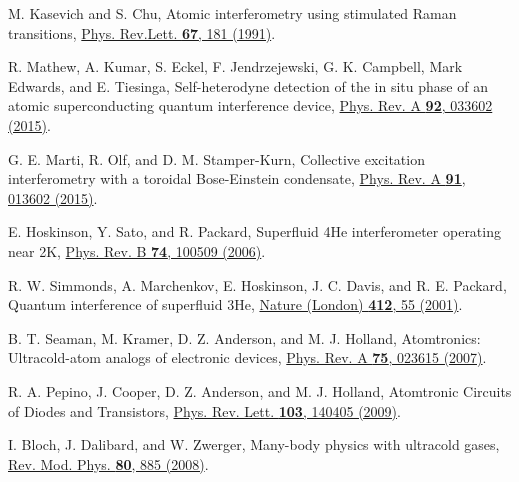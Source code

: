\documentclass[twocolumn,prl,floatfix,citeautoscript,nofootinbib]{revtex4-1}
\begin{document}
\begin{thebibliography}{99}
 M. Kasevich and S. Chu, {Atomic interferometry using
stimulated Raman transitions}, \href{https://doi.org/10.1103/PhysRevLett.67.181}%
{Phys. Rev.Lett. \textbf{67}, 181 (1991)}.

 R. Mathew, A. Kumar, S. Eckel, F. Jendrzejewski, G. K.
Campbell, Mark Edwards, and E. Tiesinga, {Self-heterodyne detection of the
in situ phase of an atomic superconducting quantum interference device},
\href{https://doi.org/10.1103/PhysRevA.92.033602}{Phys. Rev. A \textbf{92},
033602 (2015)}.

 G. E. Marti, R. Olf, and D. M. Stamper-Kurn, {Collective
excitation interferometry with a toroidal Bose-Einstein condensate}, \href{https://doi.org/10.1103/PhysRevA.91.013602}%
{Phys. Rev. A \textbf{91}, 013602 (2015)}.

 E. Hoskinson, Y. Sato, and R. Packard, {Superfluid
4He interferometer operating near 2K}, \href{https://doi.org/10.1103/PhysRevB.74.100509}%
{Phys. Rev. B \textbf{74}, 100509 (2006)}.

 R. W. Simmonds, A. Marchenkov, E. Hoskinson, J. C.
Davis, and R. E. Packard, {Quantum interference of superfluid 3He}, \href{http://dx.doi.org/10.1038/35083518}%
{Nature (London) \textbf{412}, 55 (2001)}.


 B. T. Seaman, M. Kramer, D. Z. Anderson, and M. J.
Holland, {Atomtronics: Ultracold-atom analogs of electronic devices}, \href{https://doi.org/10.1103/PhysRevA.75.023615}%
{Phys. Rev. A \textbf{75}, 023615 (2007)}.

 R. A. Pepino, J. Cooper, D. Z. Anderson, and M. J.
Holland, {Atomtronic Circuits of Diodes and Transistors}, \href{https://doi.org/10.1103/PhysRevLett.103.140405}%
{Phys. Rev. Lett. \textbf{103}, 140405 (2009)}.



 I. Bloch, J. Dalibard, and W. Zwerger, {Many-body
physics with ultracold gases}, \href{https://doi.org/10.1103/RevModPhys.80.885}%
{Rev. Mod. Phys. \textbf{80}, 885 (2008)}.



\end{thebibliography}
\end{document}
